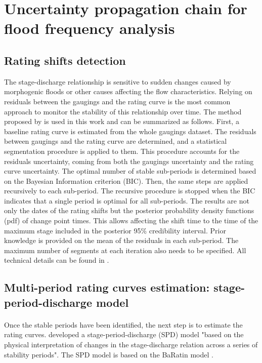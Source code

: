\documentclass[11pt]{article}
\begin{document}
\section{Uncertainty propagation chain for flood frequency analysis}
     \subsection{Rating shifts detection}
     \label{subsec:RatingShifts}
    
    The stage-discharge relationship is sensitive to sudden changes caused by morphogenic floods or other causes affecting the flow characteristics. Relying on residuals between the gaugings and the rating curve is the most common approach to monitor the stability of this relationship over time. The method proposed by \citet{darienzo_detection_2021} is used in this work and can be summarized as follows. First, a baseline rating curve is estimated from the whole gaugings dataset. The residuals between gaugings and the rating curve are determined, and a statistical segmentation procedure is applied to them. This procedure accounts for the residuals uncertainty, coming from both the gaugings uncertainty and the rating curve uncertainty. The optimal number of stable sub-periods is determined based on the Bayesian Information criterion (BIC). Then, the same steps are applied recursively to each sub-period. The recursive procedure is stopped when the BIC indicates that a single period is optimal for all sub-periods. The results are not only the dates of the rating shifts but the posterior probability density functions (pdf) of change point times. This allows affecting the shift time to the time of the maximum stage included in the posterior 95\% credibility interval. Prior knowledge is provided on the mean of the residuals in each sub-period. The maximum number of segments at each iteration also needs to be specified. All technical details can be found in \citet{darienzo_detection_2021}.
    
    \subsection{Multi-period rating curves estimation: stage-period-discharge model}
    \label{subsec:RC_SPD}
    \paragraph{}
    Once the stable periods have been identified, the next step is to estimate the rating curves. \citet{mansanarez_shift_2019} developed a stage-period-discharge (SPD) model "based on the physical interpretation of changes in the stage-discharge relation across a series of stability periods". The SPD model is based on the BaRatin model \citep{le_coz_combining_2014}.
\end{document}
